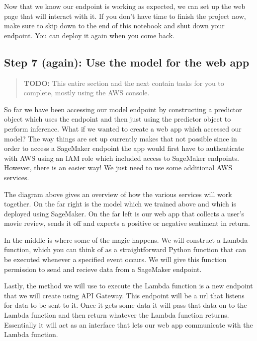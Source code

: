 \documentclass[11pt]{article}
\begin{document}
    Now that we know our endpoint is working as expected, we can set up the
web page that will interact with it. If you don't have time to finish
the project now, make sure to skip down to the end of this notebook and
shut down your endpoint. You can deploy it again when you come back.

    \hypertarget{step-7-again-use-the-model-for-the-web-app}{%
\subsection{Step 7 (again): Use the model for the web
app}\label{step-7-again-use-the-model-for-the-web-app}}

\begin{quote}
\textbf{TODO:} This entire section and the next contain tasks for you to
complete, mostly using the AWS console.
\end{quote}

So far we have been accessing our model endpoint by constructing a
predictor object which uses the endpoint and then just using the
predictor object to perform inference. What if we wanted to create a web
app which accessed our model? The way things are set up currently makes
that not possible since in order to access a SageMaker endpoint the app
would first have to authenticate with AWS using an IAM role which
included access to SageMaker endpoints. However, there is an easier way!
We just need to use some additional AWS services.

The diagram above gives an overview of how the various services will
work together. On the far right is the model which we trained above and
which is deployed using SageMaker. On the far left is our web app that
collects a user's movie review, sends it off and expects a positive or
negative sentiment in return.

In the middle is where some of the magic happens. We will construct a
Lambda function, which you can think of as a straightforward Python
function that can be executed whenever a specified event occurs. We will
give this function permission to send and recieve data from a SageMaker
endpoint.

Lastly, the method we will use to execute the Lambda function is a new
endpoint that we will create using API Gateway. This endpoint will be a
url that listens for data to be sent to it. Once it gets some data it
will pass that data on to the Lambda function and then return whatever
the Lambda function returns. Essentially it will act as an interface
that lets our web app communicate with the Lambda function.
\end{document}
